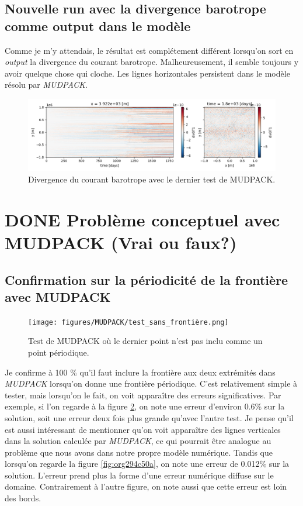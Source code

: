 \documentclass[10pt]{report}
\numberwithin{equation}{section}
\begin{document}
\subsection{Nouvelle run avec la divergence barotrope comme output dans le modèle}
\label{sec:org6bd6208}

Comme je m'y attendais, le résultat est complétement différent lorsqu'on sort en \emph{output} la divergence du courant barotrope.
Malheureusement, il semble toujours y avoir quelque chose qui cloche.
Les lignes horizontales persistent dans le modèle résolu par \emph{MUDPACK}.

\begin{figure}[!htpb]
\centering
\includegraphics[width=.9\linewidth]{figures/debuggage/2023_07_03_comp_divBT.png}
\caption{\label{fig:orge972714}Divergence du courant barotrope avec le dernier test de MUDPACK.}
\end{figure}





\section{{\bfseries\sffamily DONE} Problème conceptuel avec MUDPACK (Vrai ou faux?)}
\label{sec:org42a7830}

\subsection{Confirmation sur la périodicité de la frontière avec MUDPACK}
\label{sec:org1a5602f}

\begin{figure}[!htpb]
\centering
\texttt{[image: figures/MUDPACK/test\_sans\_frontière.png]}
\caption{\label{fig:org3cd95ca}Test de MUDPACK où le dernier point n'est pas inclu comme un point périodique.}
\end{figure}

Je confirme à 100 \% qu'il faut inclure la frontière aux deux extrémités dans \emph{MUDPACK} lorsqu'on donne une frontière périodique.
C'est relativement simple à tester, mais lorsqu'on le fait, on voit apparaître des erreurs significatives.
Par exemple, si l'on regarde à la figure \ref{fig:org3cd95ca}, on note une erreur d'environ 0.6\% sur la solution, soit une erreur deux fois plus grande qu'avec l'autre test.
Je pense qu'il est aussi intéressant de mentionner qu'on voit apparaître des lignes verticales dans la solution calculée par \emph{MUDPACK}, ce qui pourrait être analogue au problème que nous avons dans notre propre modèle numérique. 
Tandis que lorsqu'on regarde la figure \ref{fig:org294c50a}, on note une erreur de 0.012\% sur la solution.
L'erreur prend plus la forme d'une erreur numérique diffuse sur le domaine.
Contrairement à l'autre figure, on note aussi que cette erreur est loin des bords. \bigskip
\end{document}
